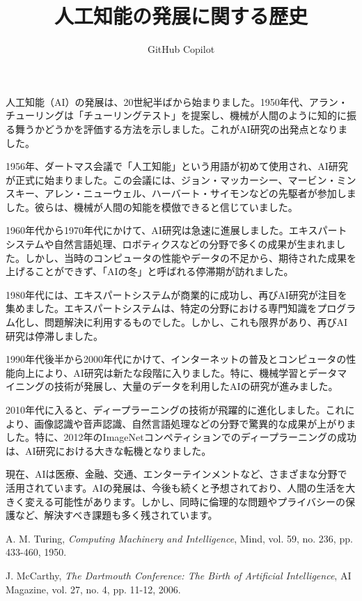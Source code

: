 \documentclass[12pt,twocolumn]{ujarticle}
\title{人工知能の発展に関する歴史}
\author{GitHub Copilot}
\date{}
\begin{document}
\maketitle
\thispagestyle{empty}


人工知能（AI）の発展は、20世紀半ばから始まりました。1950年代、アラン・チューリングは「チューリングテスト」を提案し、機械が人間のように知的に振る舞うかどうかを評価する方法を示しました。これがAI研究の出発点となりました。

1956年、ダートマス会議で「人工知能」という用語が初めて使用され、AI研究が正式に始まりました。この会議には、ジョン・マッカーシー、マービン・ミンスキー、アレン・ニューウェル、ハーバート・サイモンなどの先駆者が参加しました。彼らは、機械が人間の知能を模倣できると信じていました。

1960年代から1970年代にかけて、AI研究は急速に進展しました。エキスパートシステムや自然言語処理、ロボティクスなどの分野で多くの成果が生まれました。しかし、当時のコンピュータの性能やデータの不足から、期待された成果を上げることができず、「AIの冬」と呼ばれる停滞期が訪れました。

1980年代には、エキスパートシステムが商業的に成功し、再びAI研究が注目を集めました。エキスパートシステムは、特定の分野における専門知識をプログラム化し、問題解決に利用するものでした。しかし、これも限界があり、再びAI研究は停滞しました。

1990年代後半から2000年代にかけて、インターネットの普及とコンピュータの性能向上により、AI研究は新たな段階に入りました。特に、機械学習とデータマイニングの技術が発展し、大量のデータを利用したAIの研究が進みました。

2010年代に入ると、ディープラーニングの技術が飛躍的に進化しました。これにより、画像認識や音声認識、自然言語処理などの分野で驚異的な成果が上がりました。特に、2012年のImageNetコンペティションでのディープラーニングの成功は、AI研究における大きな転機となりました。

現在、AIは医療、金融、交通、エンターテインメントなど、さまざまな分野で活用されています。AIの発展は、今後も続くと予想されており、人間の生活を大きく変える可能性があります。しかし、同時に倫理的な問題やプライバシーの保護など、解決すべき課題も多く残されています。

\begin{thebibliography}{9}

A. M. Turing,
\textit{Computing Machinery and Intelligence},
Mind, vol. 59, no. 236, pp. 433-460, 1950.

J. McCarthy,
\textit{The Dartmouth Conference: The Birth of Artificial Intelligence},
AI Magazine, vol. 27, no. 4, pp. 11-12, 2006.

\end{thebibliography}

\end{document}
